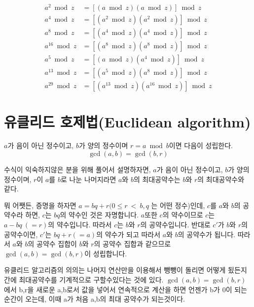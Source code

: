 \begin{align*}
    a^2 \bmod z & = [(a\bmod z)(a\bmod z)]\bmod z \\
    a^4 \bmod z & = [(a^2\bmod z)(a^2\bmod z)]\bmod z \\
    a^8 \bmod z & = [(a^4\bmod z)(a^4\bmod z)]\bmod z \\
    a^{16} \bmod z & = [(a^8 \bmod z)(a^8\bmod z)]\bmod z \\
    a^5 \bmod z & = [(a \bmod z)(a^4\bmod z)]\bmod z \\
    a^{13} \bmod z & = [(a^5\bmod z)(a^8\bmod z)]\bmod z \\ 
    a^{29} \bmod z & = [(a^{13}\bmod z)(a^{16}\bmod z)]\bmod z
\end{align*}



\section{유클리드 호제법(Euclidean algorithm)}
\begin{justbox}
$a$가 음이 아닌 정수이고, $b$가 양의 정수이며 $r=a \bmod b$이면 다음이 성립한다.
\[ \gcd(a,b) = \gcd(b,r) \]  
\end{justbox}
수식이 익숙하지않은 분을 위해 풀어서 설명하자면,
$a$가 음이 아닌 정수이고, $b$가 양의 정수이며, $r$이 $a$를 $b$로 나눈 나머지라면 $a$와 $b$의 최대공약수는 $b$와 $r$의 최대공약수와 같다.
\par
뭐 어쨋든, 증명을 하자면 $a=bq +r (0 \le r\: <\: b , q$ 는 어떤 정수)인데, $c$를 $a$와  $b$의 공약수라 하면, $c$는 $bq$의 약수인 것은 자명합니다.
$a$또한 $c$의 약수이므로 $c$는 $a-bq\:(=r)$의 약수입니다. 
따라서 $c$는 $b$와 $r$의 공약수입니다. 반대로 $c'$가 $b$와 $r$의 공약수이면, $c'$는 $bq+r(=a)$의 약수가 되고 따라서 $a$와 $b$의 공약수가 됩니다. 
따라서 $a$와 $b$의 공약수 집합이 $b$와 $r$의 공약수 집합과 같으므로 $\gcd(a,b) = \gcd(b,r)$이 성립합니다.

\vspace{1\baselineskip}

유클리드 알고리즘의 의의는 나머지 연산만을 이용해서 뺑뺑이 돌리면 어떻게 됬든지 간에 최대공약수를 기계적으로 구할수있다는 것에 있다. 
$\gcd(a,b) = \gcd(b,r)$에서 b,r을 새로운 a,b로서 값을 넣어서 연속적으로 계산을 하면 언젠가 b가 0이 되는 순간이 오는데,
이때 a가 처음 a,b의 최대 공약수가 되는것이다.




